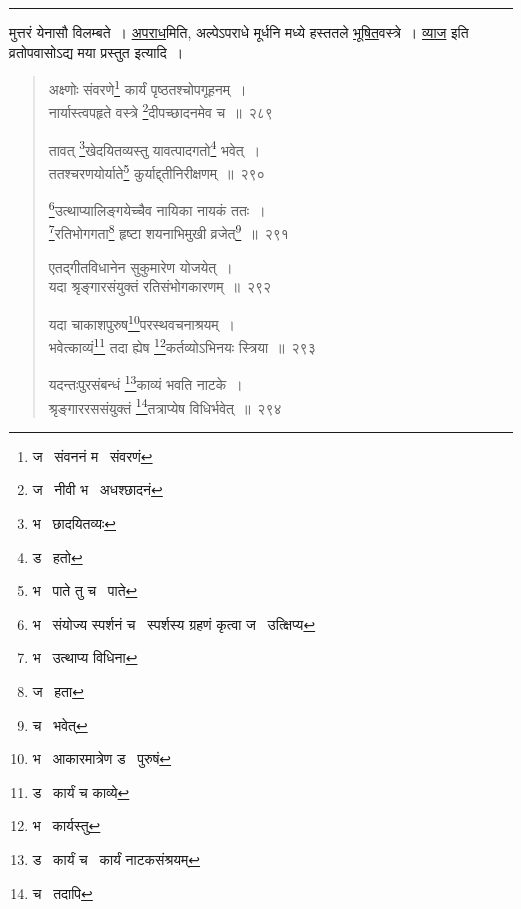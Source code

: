 \documentclass[11pt, openany]{book}
\begin{document}
\hrule

\vspace{2mm}
\noindent
मुत्तरं येनासौ विलम्बते~। \underline{अपराध}मिति, अल्पेऽपराधे मूर्धनि मध्ये हस्ततले \underline{भूषित}वस्त्रे~। \underline{व्याज} इति व्रतोपवासोऽद्य मया प्रस्तुत इत्यादि~।

\newpage

\begin{quote}
{\na अक्ष्णोः संवरणे\renewcommand{\thefootnote}{1}\footnote{ज \textendash\  संवननं म \textendash\  संवरणं} कार्यं पृष्ठतश्चोपगूहनम्~।\\
नार्यास्त्वपहृते वस्त्रे \renewcommand{\thefootnote}{2}\footnote{ज \textendash\  नीवी भ \textendash\  अधश्छादनं}दीपच्छादनमेव च~॥~२८९ 

तावत् \renewcommand{\thefootnote}{3}\footnote{भ \textendash\  छादयितव्यः}खेदयितव्यस्तु यावत्पादगतो\renewcommand{\thefootnote}{4}\footnote{ड \textendash\  हतो} भवेत्~।\\
ततश्चरणयोर्याते\renewcommand{\thefootnote}{5}\footnote{भ \textendash\  पाते तु च \textendash\  पाते} कुर्याद्द्तीनिरीक्षणम्~॥~२९० 

\renewcommand{\thefootnote}{6}\footnote{भ \textendash\  संयोज्य स्पर्शनं च \textendash\  स्पर्शस्य ग्रहणं कृत्वा ज \textendash\  उत्क्षिप्य}उत्थाप्यालिङ्गयेच्चैव नायिका नायकं ततः~।\\
\renewcommand{\thefootnote}{7}\footnote{भ \textendash\  उत्थाप्य विधिना}रतिभोगगता\renewcommand{\thefootnote}{8}\footnote{ज \textendash\  हता} हृष्टा शयनाभिमुखी व्रजेत्\renewcommand{\thefootnote}{9}\footnote{च \textendash\  भवेत्}~॥~२९१ 

एतद्गीतविधानेन सुकुमारेण योजयेत्~।\\
यदा श्रृङ्गारसंयुक्तं रतिसंभोगकारणम्~॥~२९२ 

यदा चाकाशपुरुष\renewcommand{\thefootnote}{10}\footnote{भ \textendash\  आकारमात्रेण ड \textendash\  पुरुषं}परस्थवचनाश्रयम्~। \\
भवेत्काव्यं\renewcommand{\thefootnote}{11}\footnote{ड \textendash\  कार्यं च काव्ये} तदा ह्येष \renewcommand{\thefootnote}{12}\footnote{भ \textendash\  कार्यस्तु}कर्तव्योऽभिनयः स्त्रिया~॥~२९३ 

यदन्तःपुरसंबन्धं \renewcommand{\thefootnote}{13}\footnote{ड \textendash\  कार्यं च \textendash\  कार्यं नाटकसंश्रयम्}काव्यं भवति नाटके~। \\
श्रृङ्गाररससंयुक्तं \renewcommand{\thefootnote}{14}\footnote{च \textendash\  तदापि}तत्राप्येष विधिर्भवेत्~॥~२९४}
\end{quote}
\end{document}
